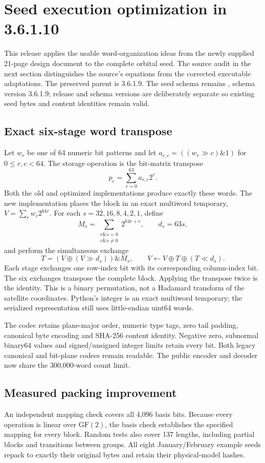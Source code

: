 \section{Seed execution optimization in 3.6.1.10}
\label{sec:seed-optimization}
This release applies the usable word-organization ideas from the newly supplied
21-page design document to the complete orbital seed. The source audit in the
next section distinguishes the source's equations from the corrected executable
adaptations. The preserved parent is 3.6.1.9. The seed schema remains
, schema version 3.6.1.9; release and schema versions are
deliberately separate so existing seed bytes and content identities remain valid.

\subsection{Exact six-stage word transpose}
Let $w_r$ be one of 64 numeric bit patterns and let
$a_{r,c}=((w_r\gg c)\mathbin{\&}1)$ for $0\le r,c<64$. The storage operation is
the bit-matrix transpose
\[
 p_c=\sum_{r=0}^{63}a_{r,c}2^r.
\]
Both the old and optimized implementations produce exactly these words.
The new implementation places the block in an exact multiword temporary,
$V=\sum_r w_r2^{64r}$. For each $s=32,16,8,4,2,1$, define
\[
 M_s=\sum_{\substack{r\mathbin{\&}s=0\\c\mathbin{\&}s\ne0}}2^{64r+c},
 \qquad d_s=63s,
\]
and perform the simultaneous exchange
\[
 T=(V\oplus(V\gg d_s))\mathbin{\&}M_s,
 \qquad V\leftarrow V\oplus T\oplus(T\ll d_s).
\]
Each stage exchanges one row-index bit with its corresponding column-index bit.
The six exchanges transpose the complete block. Applying the transpose twice is
the identity. This is a binary permutation, not a Hadamard transform of the
satellite coordinates. Python's integer is an exact multiword temporary; the
serialized representation still uses little-endian uint64 words.

The codec retains plane-major order, numeric type tags, zero tail padding,
canonical byte encoding and SHA-256 content identity. Negative zero, subnormal
binary64 values and signed/unsigned integer limits retain every bit. Both legacy
canonical and bit-plane codecs remain readable. The public encoder and decoder
now share the 300,000-word count limit.

\subsection{Measured packing improvement}
An independent mapping check covers all 4,096 basis bits. Because every operation
is linear over $\mathrm{GF}(2)$, the basis check establishes the specified mapping
for every block. Random tests also cover 137 lengths, including partial blocks
and transitions between groups. All eight January/February example seeds repack
to exactly their original bytes and retain their physical-model hashes.

